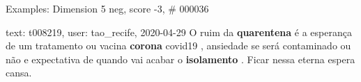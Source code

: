 \begin{frame}{Examples: Dimension 5 neg, score -3, \# 000036}
\footnotesize
\begin{alertblock}{text: t008219, user: tao\_recife, 2020-04-29}
O ruim da \textbf{quarentena} é a esperança de um tratamento ou vacina 
\textbf{corona} covid19 , ansiedade se será contaminado ou não e expectativa de 
quando vai acabar o \textbf{isolamento} . Ficar nessa eterna espera cansa. 
\end{alertblock}
\end{frame}
